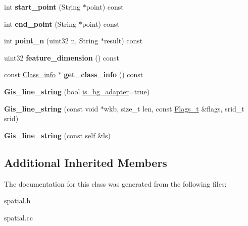 \begin{DoxyCompactItemize}
\mbox{\label{classGis__line__string_a9289c3c9861720f8a63cbcb569a0e60b}} 
int {\bfseries start\+\_\+point} (String $\ast$point) const
\item 
\mbox{\label{classGis__line__string_a37e28164e6b2471628eabd24dcf3c970}} 
int {\bfseries end\+\_\+point} (String $\ast$point) const
\item 
\mbox{\label{classGis__line__string_a89c4a684e02df5ec036f7bebe9589741}} 
int {\bfseries point\+\_\+n} (uint32 n, String $\ast$result) const
\item 
\mbox{\label{classGis__line__string_ac0105d3c5bf5cb940ad10e3f81cdc022}} 
uint32 {\bfseries feature\+\_\+dimension} () const
\item 
\mbox{\label{classGis__line__string_a1fedfbca765666e5a224fc5b2dedfcba}} 
const \mbox{\hyperlink{classGeometry_1_1Class__info}{Class\+\_\+info}} $\ast$ {\bfseries get\+\_\+class\+\_\+info} () const
\item 
\mbox{\label{classGis__line__string_a9f30185d99f4281062e199f3f2eed826}} 
{\bfseries Gis\+\_\+line\+\_\+string} (bool \mbox{\hyperlink{classGeometry_ada614004627a9e7af129e51a34242af9}{is\+\_\+bg\+\_\+adapter}}=true)
\item 
\mbox{\label{classGis__line__string_a51e7ebb45bf43498080131f9fa99128a}} 
{\bfseries Gis\+\_\+line\+\_\+string} (const void $\ast$wkb, size\+\_\+t len, const \mbox{\hyperlink{classGeometry_1_1Flags__t}{Flags\+\_\+t}} \&flags, srid\+\_\+t srid)
\item 
\mbox{\label{classGis__line__string_a28e0a979a3736a2e67296e97ae786b00}} 
{\bfseries Gis\+\_\+line\+\_\+string} (const \mbox{\hyperlink{classGis__line__string}{self}} \&ls)
\end{DoxyCompactItemize}
\subsection*{Additional Inherited Members}


The documentation for this class was generated from the following files\+:\begin{DoxyCompactItemize}
\item 
spatial.\+h\item 
spatial.\+cc\end{DoxyCompactItemize}
